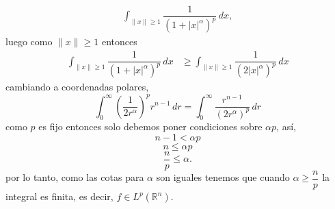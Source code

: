 \begin{itemize}
\begin{sol}
\begin{align*}
    \int_{\|x\|\geq 1} \dfrac{1}{(1 + |x|^\alpha)^p} \, dx,
  \end{align*} 
  luego como $\|x\|\geq 1$  entonces 
  \begin{align*}
    \int_{\|x\|\geq 1} \dfrac{1}{(1 + |x|^\alpha)^p} \, dx
    &\geq \int_{\|x\|\geq 1} \dfrac{1}{(2 |x|^\alpha)^p} \, dx
  \end{align*} 
  cambiando a coordenadas polares,
\[ 
 \int_{0}^{\infty} \left( \frac{1}{2r^{\alpha}} \right)^{p} r^{n-1} \, dr = \int_{0}^{\infty} \frac{r^{n-1}}{(2r^{\alpha})^{p}} \, dr 
\]
como $p$ es fijo entonces solo debemos poner condiciones sobre $\alpha p$, así, 
\[ 
n - 1 < \alpha p 
\]
\[ 
n \leq \alpha p 
\]
\[ 
\frac{n}{p} \leq \alpha. 
\]
por lo tanto, como las cotas para $\alpha$ son iguales tenemos que cuando \( \alpha \geq \dfrac{n}{p} \) la integral es finita, es decir, \( f \in L^p(\mathbb{R}^n) \). 
\end{sol}
\end{itemize}
